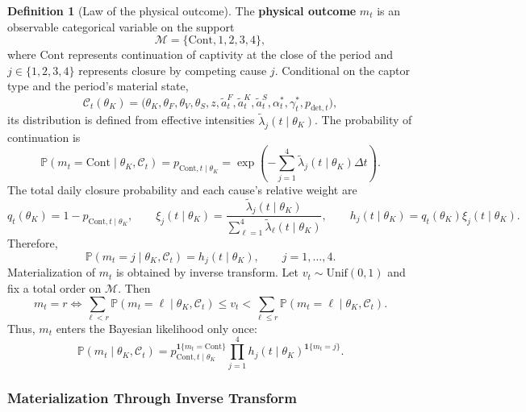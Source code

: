 \documentclass[12pt,a4paper]{article}
\theoremstyle{plain}
\theoremstyle{definition}
\newtheorem{definition}[theorem]{Definition}
\theoremstyle{remark}
\newcommand{\ProbE}{\mathbb{P}}
\newcommand{\1}{\mathbf{1}}
\newcommand{\Unif}{\mathrm{Unif}}
\begin{document}
\begin{definition}[Law of the physical outcome]
\label{def:desenlace-fisico-mt}
The \textbf{physical outcome} $m_t$ is an observable categorical variable on the support
\[
\mathcal M=\{\mathrm{Cont},1,2,3,4\},
\]
where $\mathrm{Cont}$ represents continuation of captivity at the close of the period
and $j\in\{1,2,3,4\}$ represents closure by competing cause $j$. Conditional on the
captor type and the period's material state,
\[
\mathcal C_t(\theta_K)=
\bigl(\theta_K,\theta_F,\theta_V,\theta_S,z,\tilde a_t^F,\tilde a_t^K,\tilde a_t^S,
\alpha_t^\ast,\gamma_t^\ast,p_{\mathrm{det},t}\bigr),
\]
its distribution is defined from effective intensities $\tilde\lambda_j(t\mid\theta_K)$.
The probability of continuation is
\begin{equation}
\label{eq:m-law-cont}
\ProbE(m_t=\mathrm{Cont}\mid\theta_K,\mathcal C_t)
=p_{\mathrm{Cont},t\mid\theta_K}
=\exp\left(-\sum_{j=1}^{4}\tilde\lambda_j(t\mid\theta_K)\Delta t\right).
\end{equation}
The total daily closure probability and each cause's relative weight are
\begin{equation}
\label{eq:m-law-hazard}
q_t(\theta_K)=1-p_{\mathrm{Cont},t\mid\theta_K},
\qquad
\xi_j(t\mid\theta_K)=
\frac{\tilde\lambda_j(t\mid\theta_K)}
{\sum_{\ell=1}^{4}\tilde\lambda_\ell(t\mid\theta_K)},
\qquad
h_j(t\mid\theta_K)=q_t(\theta_K)\xi_j(t\mid\theta_K).
\end{equation}
Therefore,
\begin{equation}
\label{eq:m-law-out}
\ProbE(m_t=j\mid\theta_K,\mathcal C_t)=h_j(t\mid\theta_K),
\qquad j=1,\dots,4.
\end{equation}
Materialization of $m_t$ is obtained by inverse transform. Let $v_t\sim\Unif(0,1)$ and
fix a total order on $\mathcal M$. Then
\begin{equation}
\label{eq:m-law-inverse}
m_t=r
\iff
\sum_{\ell<r}\ProbE(m_t=\ell\mid\theta_K,\mathcal C_t)
\le v_t <
\sum_{\ell\le r}\ProbE(m_t=\ell\mid\theta_K,\mathcal C_t).
\end{equation}
Thus, $m_t$ enters the Bayesian likelihood only once:
\begin{equation}
\label{eq:m-law-likelihood}
\ProbE(m_t\mid\theta_K,\mathcal C_t)
=
p_{\mathrm{Cont},t\mid\theta_K}^{\mathbf 1\{m_t=\mathrm{Cont}\}}
\prod_{j=1}^{4}
h_j(t\mid\theta_K)^{\mathbf 1\{m_t=j\}}.
\end{equation}
\end{definition}

\subsubsection{Materialization Through Inverse Transform}
\label{sec:mecanismo-realizacion}
\end{document}
